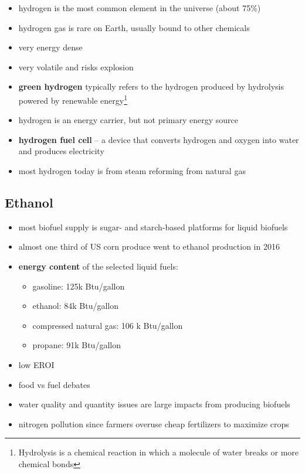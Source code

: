 \begin{itemize}
	\item hydrogen is the most common element in the universe (about 75\%)
	\item hydrogen gas is rare on Earth, usually bound to other chemicals
	\item very energy dense
	\item very volatile and risks explosion
	\item \textbf{green hydrogen} typically refers to the hydrogen
	produced by hydrolysis powered by renewable energy\footnote{
		Hydrolysis is a chemical reaction in which a molecule of water
		breaks or more chemical bonds}
	\item hydrogen is an energy carrier, but not primary energy source
	\item \textbf{hydrogen fuel cell} -- a device that converts hydrogen
	and oxygen into water and produces electricity
	\item most hydrogen today is from steam reforming from natural gas
\end{itemize}

\subsection{Ethanol}
\begin{itemize}
	\item most biofuel supply is sugar- and starch-based platforms for
	liquid biofuels
	\item almost one third of US corn produce went to ethanol production in
	2016
	\item \textbf{energy content} of the selected liquid fuels:
	\begin{itemize}
		\item gasoline: 125k Btu/gallon
		\item ethanol: 84k Btu/gallon
		\item compressed natural gas: 106 k Btu/gallon
		\item propane: 91k Btu/gallon
	\end{itemize}
	\item low EROI
	\item food vs fuel debates
	\item water quality and quantity issues are large impacts from
	producing biofuels
	\item nitrogen pollution since farmers overuse cheap fertilizers to
	maximize crops
\end{itemize}


